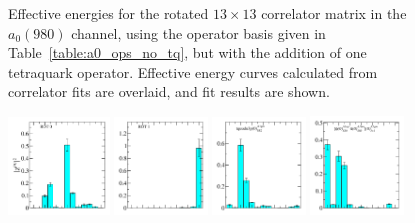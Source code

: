 \begin{figure}
  \caption[Effective energies for the rotated $13\times 13$ correlator matrix in the $a_0(980)$ channel, using the operator basis given in Table~\ref{table:a0_ops_no_tq}, but with the addition of one tetraquark operator.]{Effective energies for the rotated $13\times 13$ correlator matrix in the $a_0(980)$ channel, using the operator basis given in Table~\ref{table:a0_ops_no_tq}, but with the addition of one tetraquark operator. Effective energy curves calculated from correlator fits are overlaid, and fit results are shown.}
  \label{fig:a0_with_tq_grid}
\end{figure}

\begin{figure}
  \includegraphics[width=0.24\textwidth]{figures/spectrum_a1gm/with_tq/zfactors/zfactor_isotriplet-S0-P000-A1gm_1-ROT-0.pdf}
  \includegraphics[width=0.22\textwidth]{figures/spectrum_a1gm/with_tq/zfactors/zfactor_isotriplet-S0-P000-A1gm_1-ROT-1.pdf}
  \includegraphics[width=0.22\textwidth]{figures/spectrum_a1gm/with_tq/zfactors/zfactor_tquudu3p-P000-A1gm_1-SS_2.pdf}
  \includegraphics[width=0.22\textwidth]{figures/spectrum_a1gm/with_tq/zfactors/zfactor_isotriplet_phi_pion-A1gm_1-P000-A1up-SS_0-P000-A1um-SS_0.pdf}\\

\end{figure}
